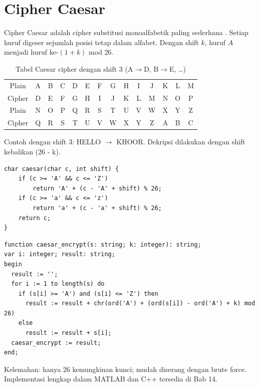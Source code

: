 \section{Cipher Caesar}

Cipher Caesar adalah cipher substitusi monoalfabetik paling sederhana \cite{schneier1996,trappe2006}. Setiap huruf digeser sejumlah posisi tetap dalam alfabet. Dengan shift $k$, huruf $A$ menjadi huruf ke-$(1+k)$ mod 26.

\begin{table}[!htbp]
\centering
\caption{Tabel Caesar cipher dengan shift 3 (A$\to$D, B$\to$E, \ldots)}
\label{tab:caesar}
\begin{tabular}{@{}*{14}{c}@{}}
\toprule
Plain & A & B & C & D & E & F & G & H & I & J & K & L & M \\
Cipher & D & E & F & G & H & I & J & K & L & M & N & O & P \\
\midrule
Plain & N & O & P & Q & R & S & T & U & V & W & X & Y & Z \\
Cipher & Q & R & S & T & U & V & W & X & Y & Z & A & B & C \\
\bottomrule
\end{tabular}
\end{table}

Contoh dengan shift 3: HELLO $\to$ KHOOR. Dekripsi dilakukan dengan shift kebalikan (26 - k).

\begin{lstlisting}[style=cstyle,caption={Caesar Cipher dalam C (ringkas)}]
char caesar(char c, int shift) {
    if (c >= 'A' && c <= 'Z')
        return 'A' + (c - 'A' + shift) % 26;
    if (c >= 'a' && c <= 'z')
        return 'a' + (c - 'a' + shift) % 26;
    return c;
}
\end{lstlisting}

\begin{lstlisting}[style=pascalstyle,caption={Caesar Cipher dalam Pascal (ringkas)}]
function caesar_encrypt(s: string; k: integer): string;
var i: integer; result: string;
begin
  result := '';
  for i := 1 to length(s) do
    if (s[i] >= 'A') and (s[i] <= 'Z') then
      result := result + chr(ord('A') + (ord(s[i]) - ord('A') + k) mod 26)
    else
      result := result + s[i];
  caesar_encrypt := result;
end;
\end{lstlisting}

Kelemahan: hanya 26 kemungkinan kunci; mudah diserang dengan brute force. Implementasi lengkap dalam MATLAB dan C++ tersedia di Bab 14.
